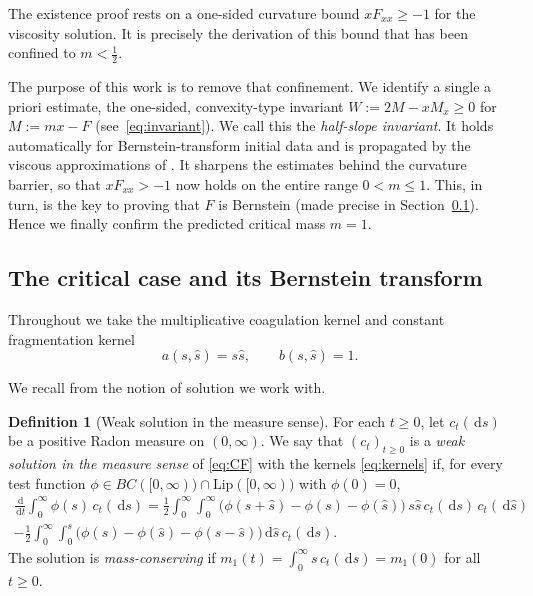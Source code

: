 \documentclass[12pt]{amsart}
\numberwithin{equation}{section}
\theoremstyle{plain}
\theoremstyle{definition}
\newtheorem{definition}[theorem]{Definition}
\newcommand{\dd}{\,\mathrm{d}}
\begin{document}
The existence proof rests on a one-sided
curvature bound
$xF_{xx}\ge-1$ for the viscosity solution.
It is precisely the derivation of
this bound that has been confined to $m<\tfrac12$.

The purpose of this work is to remove that confinement. We identify a
single a priori estimate, the one-sided, convexity-type invariant
\(W := 2M - xM_x \ge 0\) for \(M := mx - F\) (see~\eqref{eq:invariant}).
We call this the \emph{half-slope invariant}.
It holds
automatically for Bernstein-transform initial data and is propagated
by the viscous approximations of \cite{TV}. It sharpens the estimates
behind the curvature barrier, so that \(xF_{xx} > -1\) now holds on
the entire range \(0 < m \le 1\).
This, in turn, is the key to
proving that \(F\) is Bernstein (made precise in Section~\ref{sec:Bernstein}). Hence we finally confirm the
predicted critical mass \(m = 1\).

\subsection{The critical case and its Bernstein transform}
\label{sec:Bernstein}
Throughout we take the multiplicative coagulation kernel and constant
fragmentation kernel
\begin{equation}\label{eq:kernels}
	a(s,\hat s)=s\hat s,\qquad b(s,\hat s)=1 .
\end{equation}

We recall from \cite{TV} the notion of solution we work with.

\begin{definition}[Weak solution in the measure sense]\label{def:measure}
	For each $t\ge0$, let $c_t(\dd s)$ be a positive Radon measure on
	$(0,\infty)$. We say that $(c_t)_{t\ge0}$ is a \emph{weak solution in the
		measure sense} of \eqref{eq:CF} with the kernels \eqref{eq:kernels} if, for
	every test function $\phi\in BC([0,\infty))\cap\mathrm{Lip}([0,\infty))$
	with $\phi(0)=0$,
	\begin{multline*}
		\frac{\dd}{\dd t}\int_0^\infty\phi(s)\,c_t(\dd s)
		=\frac12\int_0^\infty\!\!\int_0^\infty
		\bigl(\phi(s+\hat s)-\phi(s)-\phi(\hat s)\bigr)\,
		s\hat s\,c_t(\dd s)\,c_t(\dd\hat s)\\
		-\frac12\int_0^\infty\!\!\int_0^s
		\bigl(\phi(s)-\phi(\hat s)-\phi(s-\hat s)\bigr)\dd\hat s\,c_t(\dd s) .
	\end{multline*}
	The solution is \emph{mass-conserving} if
	$m_1(t)=\int_0^\infty s\,c_t(\dd s)=m_1(0)$ for all $t\ge0$.
\end{definition}
\end{document}

